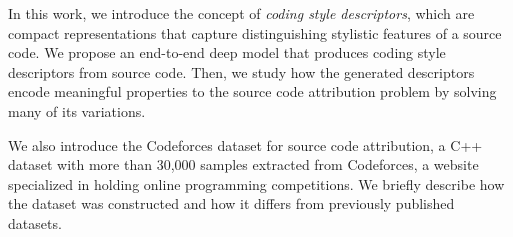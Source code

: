 In this work, we introduce the concept of \textit{coding style descriptors}, which are compact representations that capture distinguishing stylistic features of a source code. We propose an end-to-end deep model that produces coding style descriptors from source code. Then, we study how the generated descriptors encode meaningful properties to the source code attribution problem by solving many of its variations.

We also introduce the Codeforces dataset for source code attribution, a C++ dataset with more than 30,000 samples extracted from Codeforces, a website specialized in holding online programming competitions. We briefly describe how the dataset was constructed and how it differs from previously published datasets.

